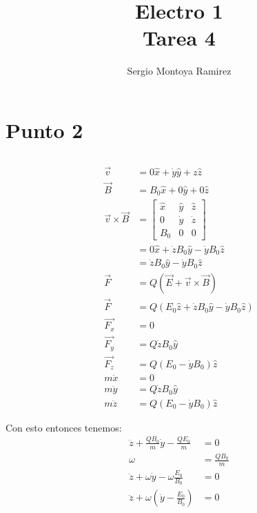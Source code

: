 \documentclass{report}
\title{\Huge{Electro 1}\\Tarea 4}
\author{\huge{Sergio Montoya Ramirez}} \date{}
\begin{document}
\maketitle
\newpage%
\tableofcontents
\pagebreak

\chapter{Punto 2}


\section{}

\begin{align*}
	\vec{v} &= 0 \hat{x} + \dot{y} \hat{y} + z \hat{z}\\
	\vec{B} &= B_0 \hat{x} + 0 \hat{y} + 0 \hat{z}\\
	\vec{v} \times \vec{B} &= \begin{bmatrix}
		\hat{x} & \hat{y} & \hat{z}\\
		0 & \dot{y} & \dot{z} \\
		B_0 & 0 & 0
	\end{bmatrix}\\
	&= 0 \hat{x} + \dot{z}B_0 \hat{y} - \dot{y}B_0 \hat{z}\\
	&= \dot{z}B_0 \hat{y} - \dot{y}B_0 \hat{z}\\
	\vec{F} &= Q \left( \vec{E} + \vec{v} \times \vec{B} \right)\\
	\vec{F} &= Q \left( E_0 \hat{z} + \dot{z}B_0 \hat{y} - \dot{y}B_0 \hat{z} \right)\\
	\vec{F_x} &= 0\\
	\vec{F_y} &= Q \dot{z}B_0 \hat{y}\\
	\vec{F_z} &= Q \left( E_0 - \dot{y}B_0 \right) \hat{z}\\
	m \ddot{x} &= 0\\
	m \ddot{y} &= Q \dot{z}B_0 \hat{y}\\
	m \ddot{z} &= Q \left( E_0 - \dot{y}B_0 \right) \hat{z}
\end{align*}

Con esto entonces tenemos:
\begin{align*}
	\ddot{z} + \frac{Q B_0}{m}\dot{y} - \frac{Q E_0}{m} &= 0\\
	\omega &= \frac{Q B_0}{m}\\
	\ddot{z} + \omega \dot{y} - \omega \frac{E_0}{B_0} &= 0\\
	\ddot{z} + \omega \left(\dot{y} - \frac{E_0}{B_0} \right) &= 0\\
\end{align*}
\end{document}
